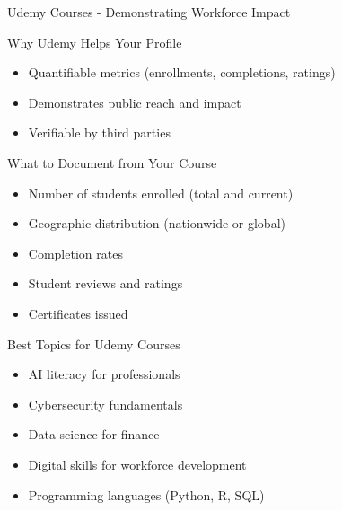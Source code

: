\documentclass[11pt]{beamer}
\begin{document}
				\begin{frame}{Udemy Courses - Demonstrating Workforce Impact}
					\scriptsize
					\begin{block}{Why Udemy Helps Your Profile}
						\begin{itemize}
							\item Quantifiable metrics (enrollments, completions, ratings)
							\item Demonstrates public reach and impact
							\item Verifiable by third parties
						\end{itemize}
					\end{block}
					\begin{block}{What to Document from Your Course}
						\begin{itemize}
							\item Number of students enrolled (total and current)
							\item Geographic distribution (nationwide or global)
							\item Completion rates
							\item Student reviews and ratings
							\item Certificates issued
						\end{itemize}
					\end{block}
					\begin{block}{Best Topics for Udemy Courses}
						\begin{itemize}
							\item AI literacy for professionals
							\item Cybersecurity fundamentals
							\item Data science for finance
							\item Digital skills for workforce development
							\item Programming languages (Python, R, SQL)
						\end{itemize}
					\end{block}
				\end{frame}
				
\end{document}

